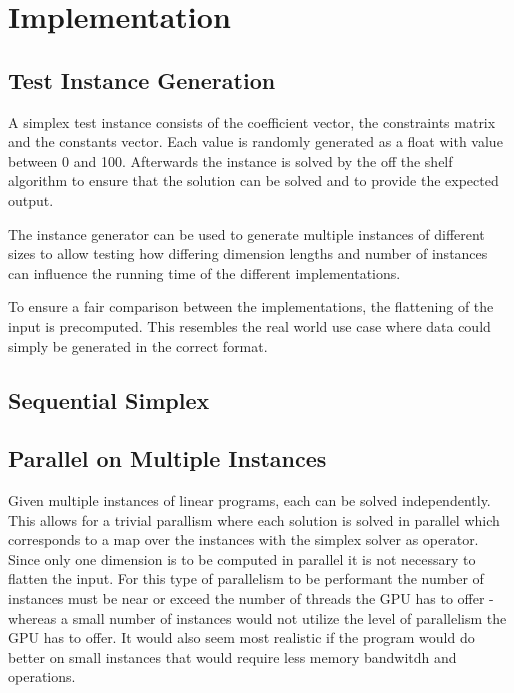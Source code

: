 \section{Implementation}
\subsection{Test Instance Generation}
A simplex test instance consists of the coefficient vector, the constraints matrix and the constants vector. Each value is randomly generated as a float with value between 0 and 100. Afterwards the instance is solved by the off the shelf algorithm to ensure that the solution can be solved and to provide the expected output. 

The instance generator can be used to generate multiple instances of different sizes to allow testing how differing dimension lengths and number of instances can influence the running time of the different implementations.

To ensure a fair comparison between the implementations, the flattening of the input is precomputed. This resembles the real world use case where data could simply be generated in the correct format.

\subsection{Sequential Simplex}

\subsection{Parallel on Multiple Instances}
Given multiple instances of linear programs, each can be solved independently. This allows for a trivial parallism where each solution is solved in parallel which corresponds to a map over the instances with the simplex solver as operator. Since only one dimension is to be computed in parallel it is not necessary to flatten the input. For this type of parallelism to be performant the number of instances must be near or exceed the number of threads the GPU has to offer - whereas a small number of instances would not utilize the level of parallelism the GPU has to offer. It would also seem most realistic if the program would do better on small instances that would require less memory bandwitdh and operations.

